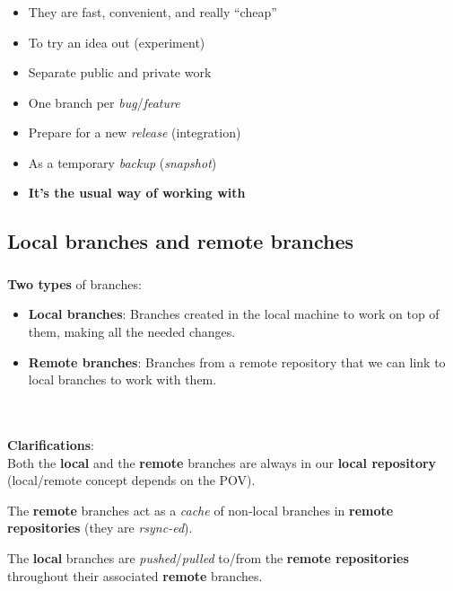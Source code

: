 \begin{frame}
  \frametitle{\insertsubsection}

  \begin{itemize}
  \item They are fast, convenient, and really ``cheap''\vspacing
  \item To try an idea out (experiment) \vspacing
  \item Separate public and private work \vspacing
  \item One branch per \textit{bug}/\textit{feature} \vspacing
  \item Prepare for a new \textit{release} (integration) \vspacing
  \item As a temporary \textit{backup} (\textit{snapshot}) \vspacing
  \item \textbf{It's the usual way of working with \git} \vspacing
  \end{itemize}
\end{frame}


\subsection{Local branches and remote branches}

\begin{frame}
  \frametitle{\insertsubsection}

  \textbf{Two types} of branches:
  \begin{itemize}
  \item \textbf{Local branches}: Branches created in the local machine
    to work on top of them, making all the needed changes.\vspacing

  \item \textbf{Remote branches}: Branches from a remote repository
    that we can link to local branches to work with them.
  \end{itemize}\  \\ \ \\


  \textbf{Clarifications}:\\
  Both the \textbf{local} and the  \textbf{remote} branches are always
  in our \textbf{local repository} (local/remote concept depends on
  the POV). \vspacing

  The \textbf{remote} branches act as a \textit{cache} of non-local
  branches in \textbf{remote repositories} (they are \textit{rsync-ed}). \vspacing

  The \textbf{local} branches are \textit{pushed}/\textit{pulled} to/from the \textbf{remote
    repositories} throughout their associated \textbf{remote} branches.

\end{frame}

